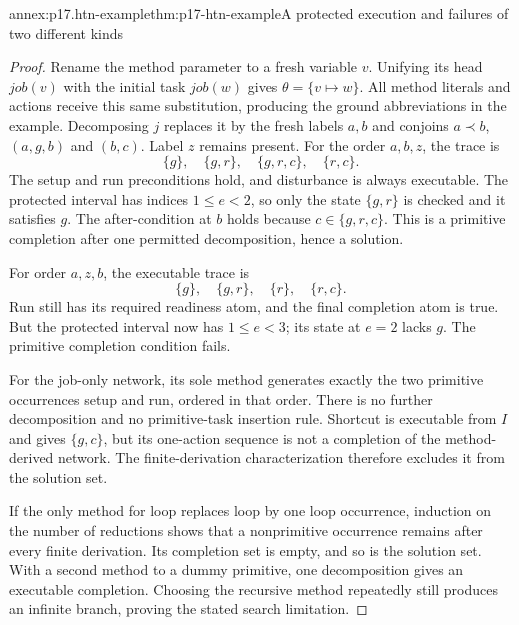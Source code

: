 \begin{annexitem}{annex:p17.htn-example}{thm:p17-htn-example}{A protected execution and failures of two different kinds}
\begin{proof}
Rename the method parameter to a fresh variable \(v\). Unifying its head
\(\mathit{job}(v)\) with the initial task \(\mathit{job}(w)\) gives
\(\theta=\{v\mapsto w\}\). All method literals and actions receive this
same substitution, producing the ground abbreviations in the example.
Decomposing \(j\) replaces it by the fresh labels \(a,b\) and conjoins
\(a\prec b\), \((a,g,b)\) and \((b,c)\). Label \(z\) remains present.
For the order \(a,b,z\), the trace is
\[
 \{g\},\quad\{g,r\},\quad\{g,r,c\},\quad\{r,c\}.
\]
The setup and run preconditions hold, and disturbance is always executable.
The protected interval has indices \(1\leq e<2\), so only the state
\(\{g,r\}\) is checked and it satisfies \(g\). The after-condition at
\(b\) holds because \(c\in\{g,r,c\}\). This is a primitive completion
after one permitted decomposition, hence a solution.

For order \(a,z,b\), the executable trace is
\[
 \{g\},\quad\{g,r\},\quad\{r\},\quad\{r,c\}.
\]
Run still has its required readiness atom, and the final completion atom is
true. But the protected interval now has \(1\leq e<3\); its state at
\(e=2\) lacks \(g\). The primitive completion condition fails.

For the job-only network, its sole method generates exactly the two primitive
occurrences setup and run, ordered in that order. There is no further
decomposition and no primitive-task insertion rule. Shortcut is executable
from \(I\) and gives \(\{g,c\}\), but its one-action sequence is not a
completion of the method-derived network. The finite-derivation characterization
therefore excludes it from the solution set.

If the only method for loop replaces loop by one loop occurrence, induction
on the number of reductions shows that a nonprimitive occurrence remains
after every finite derivation. Its completion set is empty, and so is the
solution set. With a second method to a dummy primitive, one decomposition
gives an executable completion. Choosing the recursive method repeatedly
still produces an infinite branch, proving the stated search limitation.
\end{proof}
\end{annexitem}

